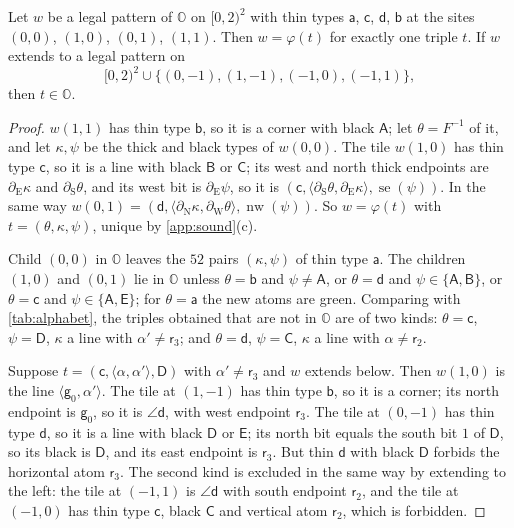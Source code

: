 \begin{lemma}[Parents]\label{app:parents}
Let $w$ be a legal pattern of $\mathbb O$ on $[0,2)^2$ with thin types $\mathsf a$, $\mathsf c$, $\mathsf d$, $\mathsf b$ at the sites $(0,0)$, $(1,0)$, $(0,1)$, $(1,1)$. Then $w=\varphi(t)$ for exactly one triple $t$. If $w$ extends to a legal pattern on
\[
[0,2)^2\cup\{(0,-1),(1,-1),(-1,0),(-1,1)\},
\]
then $t\in\mathbb O$.
\end{lemma}

\begin{proof}
$w(1,1)$ has thin type $\mathsf b$, so it is a corner with black $\mathsf A$; let $\theta=F^{-1}$ of it, and let $\kappa,\psi$ be the thick and black types of $w(0,0)$. The tile $w(1,0)$ has thin type $\mathsf c$, so it is a line with black $\mathsf B$ or $\mathsf C$; its west and north thick endpoints are $\partial_{\mathrm E}\kappa$ and $\partial_{\mathrm S}\theta$, and its west bit is $\partial_{\mathrm E}\psi$, so it is $(\mathsf c,\langle\partial_{\mathrm S}\theta,\partial_{\mathrm E}\kappa\rangle,\operatorname{se}(\psi))$. In the same way $w(0,1)=(\mathsf d,\langle\partial_{\mathrm N}\kappa,\partial_{\mathrm W}\theta\rangle,\operatorname{nw}(\psi))$. So $w=\varphi(t)$ with $t=(\theta,\kappa,\psi)$, unique by \cref{app:sound}(c).

Child $(0,0)$ in $\mathbb O$ leaves the $52$ pairs $(\kappa,\psi)$ of thin type $\mathsf a$. The children $(1,0)$ and $(0,1)$ lie in $\mathbb O$ unless $\theta=\mathsf b$ and $\psi\ne\mathsf A$, or $\theta=\mathsf d$ and $\psi\in\{\mathsf A,\mathsf B\}$, or $\theta=\mathsf c$ and $\psi\in\{\mathsf A,\mathsf E\}$; for $\theta=\mathsf a$ the new atoms are green. Comparing with \cref{tab:alphabet}, the triples obtained that are not in $\mathbb O$ are of two kinds: $\theta=\mathsf c$, $\psi=\mathsf D$, $\kappa$ a line with $\alpha'\ne\mathsf r_3$; and $\theta=\mathsf d$, $\psi=\mathsf C$, $\kappa$ a line with $\alpha\ne\mathsf r_2$.

Suppose $t=(\mathsf c,\langle\alpha,\alpha'\rangle,\mathsf D)$ with $\alpha'\ne\mathsf r_3$ and $w$ extends below. Then $w(1,0)$ is the line $\langle\mathsf g_0,\alpha'\rangle$. The tile at $(1,-1)$ has thin type $\mathsf b$, so it is a corner; its north endpoint is $\mathsf g_0$, so it is $\angle\mathsf d$, with west endpoint $\mathsf r_3$. The tile at $(0,-1)$ has thin type $\mathsf d$, so it is a line with black $\mathsf D$ or $\mathsf E$; its north bit equals the south bit $1$ of $\mathsf D$, so its black is $\mathsf D$, and its east endpoint is $\mathsf r_3$. But thin $\mathsf d$ with black $\mathsf D$ forbids the horizontal atom $\mathsf r_3$. The second kind is excluded in the same way by extending to the left: the tile at $(-1,1)$ is $\angle\mathsf d$ with south endpoint $\mathsf r_2$, and the tile at $(-1,0)$ has thin type $\mathsf c$, black $\mathsf C$ and vertical atom $\mathsf r_2$, which is forbidden.
\end{proof}

